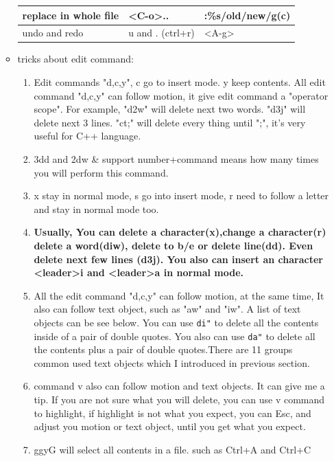 \documentclass[a4paper,12pt,twoside]{book}
\begin{document}
\begin{itemize}
\begin{itemize}
\begin{center}
\begin{tabular}{p{}|p{}|p{}}
		\hline 
	   replace in whole file &<C-o>.. & :\%s/old/new/g(c) \\

		\hline 
		undo and redo & u and . (ctrl+r)  & <A-g> \\ 
		
				\end{tabular}
	\end{center}
	
\item tricks about edit command: 
\begin{enumerate}

				\item  Edit commands "d,c,y", c go to insert mode. y keep contents. All edit command "d,c,y" can follow motion, it give edit command a "operator scope". For example, "d2w" will delete next two words. "d3j" will delete next 3 lines. "ct;" will delete every thing until ";", it's very useful for C++ language. 

			\item 3dd and 2dw   \& support number+command means how many times you will perform this command.

				\item x stay in normal mode, s go into insert mode, r need to follow a letter and stay in normal mode too.
				
				\item \textbf{Usually, You can delete a character(x),change a character(r) delete a word(diw), delete to b/e or delete line(dd). Even delete next few lines (d3j). You also can insert an character <leader>i and <leader>a in normal mode. }  
				
				\item All the edit command "d,c,y" can follow motion, at the same time, It also can follow text object, such as "aw" and "iw". A list of text objects can be see below.  You can use \verb=di"= to delete all the contents inside of a pair of double quotes. You also can use \verb=da"= to delete all the contents plus a pair of double quotes.There are 11 groups common used text objects which I introduced in previous section. 
						
				\item command v also can follow motion and text objects. It can give me a tip. If you are not sure what you will delete, you can use v command to highlight, if highlight is not what you expect, you can Esc, and adjust you motion or text object, until you get what you expect. 

				\item ggyG will select all contents in a file. such as Ctrl+A and Ctrl+C 


\end{enumerate}
\end{itemize}
\end{itemize}
\end{document}
